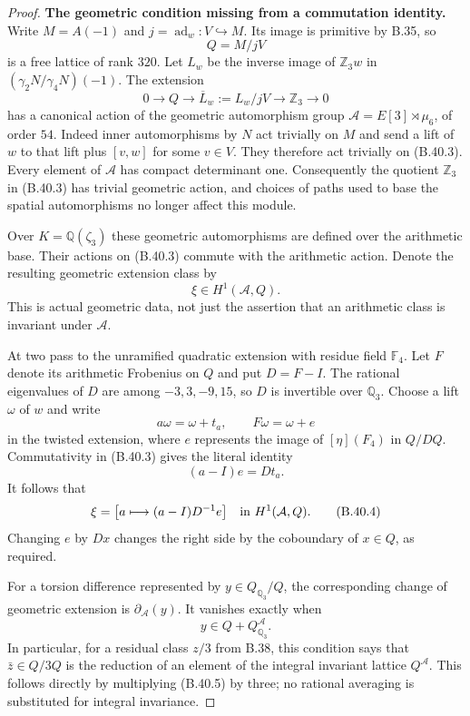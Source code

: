 \begin{proof}
\par\smallskip\noindent\textbf{The geometric condition missing from a commutation identity.}\enspace 
Write $M=A(-1)$ and $j=\operatorname{ad}_w:V\hookrightarrow M$.
Its image is primitive by B.35, so
\[
                         Q=M/jV
\]
is a free lattice of rank $320$.
Let $L_w$ be the inverse image of $\mathbb Z_3w$ in
$(\gamma_2N/\gamma_4N)(-1)$.
The extension
\[
 0\longrightarrow Q\longrightarrow \overline L_w
       :=L_w/jV\longrightarrow\mathbb Z_3\longrightarrow0
                                                               \tag{B.40.3}
\]
has a canonical action of the geometric automorphism group
$\mathcal A=E[3]\rtimes\mu_6$, of order $54$.
Indeed inner automorphisms by $N$ act trivially on $M$ and
send a lift of $w$ to that lift plus $[v,w]$ for some $v\in V$.
They therefore act trivially on (B.40.3).
Every element of $\mathcal A$ has compact determinant one.
Consequently the quotient $\mathbb Z_3$ in (B.40.3) has
trivial geometric action, and choices of paths used to
base the spatial automorphisms no longer affect this module.

Over $K=\mathbb Q(\zeta_3)$ these geometric automorphisms
are defined over the arithmetic base. Their actions on
(B.40.3) commute with the arithmetic action. Denote the
resulting geometric extension class by
\[
                   \xi\in H^1(\mathcal A,Q).
\]
This is actual geometric data, not just the assertion that
an arithmetic class is invariant under $\mathcal A$.

At two pass to the unramified quadratic extension with
residue field $\mathbb F_4$. Let $F$ denote its arithmetic
Frobenius on $Q$ and put $D=F-I$.
The rational eigenvalues of $D$ are among
$-3,3,-9,15$, so $D$ is invertible over $\mathbb Q_3$.
Choose a lift $\omega$ of $w$ and write
\[
       a\omega=\omega+t_a,\qquad
       F\omega=\omega+e
\]
in the twisted extension, where $e$ represents the image
of $[\eta](F_4)$ in $Q/DQ$.
Commutativity in (B.40.3) gives the literal identity
\[
                   (a-I)e=Dt_a.
\]
It follows that
\[
 \xi=\bigl[a\longmapsto(a-I)D^{-1}e\bigr]
                  \quad\hbox{in }H^1(\mathcal A,Q).           \tag{B.40.4}
\]
Changing $e$ by $Dx$ changes the right side by the
coboundary of $x\in Q$, as required.

For a torsion difference represented by
$y\in Q_{\mathbb Q_3}/Q$, the corresponding change of
geometric extension is $\partial_{\mathcal A}(y)$.
It vanishes exactly when
\[
                         y\in Q+Q_{\mathbb Q_3}^{\mathcal A}.
                                                               \tag{B.40.5}
\]
In particular, for a residual class $z/3$ from B.38,
this condition says that $\bar z\in Q/3Q$ is the reduction
of an element of the integral invariant lattice $Q^{\mathcal A}$.
This follows directly by multiplying (B.40.5) by three;
no rational averaging is substituted for integral invariance.


\end{proof}
